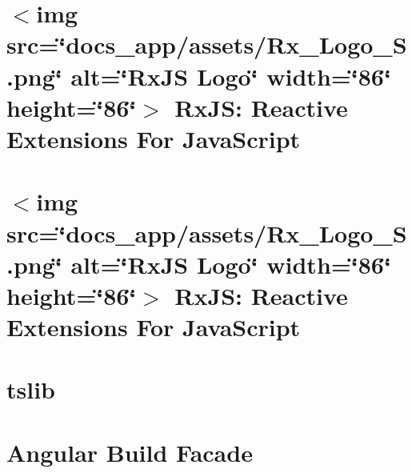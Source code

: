 \documentclass[twoside]{book}
\newcommand{\+}{\discretionary{\mbox{\scriptsize$\hookleftarrow$}}{}{}}
\begin{document}
\chapter{\texorpdfstring{$<$}{<}img src=\char`\"{}docs\+\_\+app/assets/\+Rx\+\_\+\+Logo\+\_\+\+S.\+png\char`\"{} alt=\char`\"{}\+Rx\+JS Logo\char`\"{} width=\char`\"{}86\char`\"{} height=\char`\"{}86\char`\"{}\texorpdfstring{$>$}{>} Rx\+JS\+: Reactive Extensions For Java\+Script}
\label{md__c___users_vaishnavi_jadhav__desktop__developer_code_mean_stack_example_client_node_modules__5859207bc9434408af1bc9788bc5e8d8}

\chapter{\texorpdfstring{$<$}{<}img src=\char`\"{}docs\+\_\+app/assets/\+Rx\+\_\+\+Logo\+\_\+\+S.\+png\char`\"{} alt=\char`\"{}\+Rx\+JS Logo\char`\"{} width=\char`\"{}86\char`\"{} height=\char`\"{}86\char`\"{}\texorpdfstring{$>$}{>} Rx\+JS\+: Reactive Extensions For Java\+Script}
\label{md__c___users_vaishnavi_jadhav__desktop__developer_code_mean_stack_example_client_node_modules__871a78a9900fa5f3570cbf6697af38ad}

\chapter{tslib}
\label{md__c___users_vaishnavi_jadhav__desktop__developer_code_mean_stack_example_client_node_modules__482f4ebfc0b3955f4b398f8dd2ff13e1}

\chapter{Angular Build Facade}
\label{md__c___users_vaishnavi_jadhav__desktop__developer_code_mean_stack_example_client_node_modules__bdd7866b3363278ad00727a02d044662}

\end{document}

